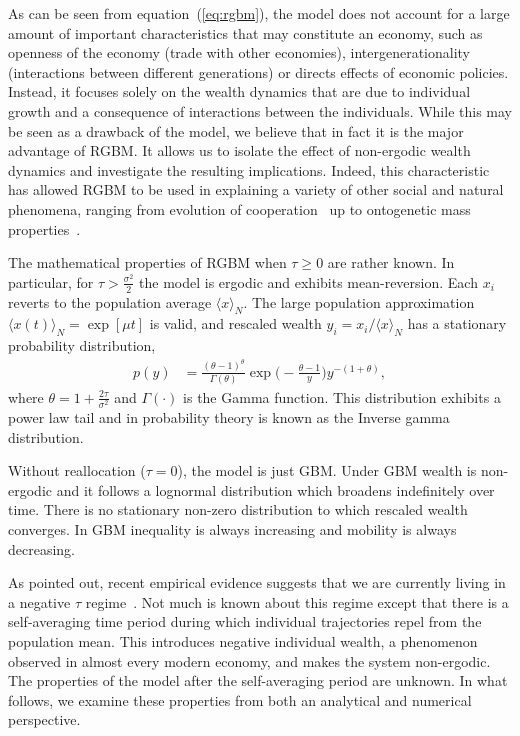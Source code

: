 \documentclass[11pt]{article}
\numberwithin{equation}{section}
\begin{document}
As can be seen from equation~(\ref{eq:rgbm}), the model does not account for a large amount of important characteristics that may constitute an economy, such as openness of the economy (trade with other economies), intergenerationality (interactions between different generations) or directs effects of economic policies. Instead, it focuses solely on the wealth dynamics that are due to individual growth and a consequence of interactions between the individuals. While this may be seen as a drawback of the model, we believe that in fact it is the major advantage of RGBM. It allows us to isolate the effect of non-ergodic wealth dynamics and investigate the resulting implications. Indeed, this characteristic has allowed RGBM to be used in explaining a variety of other social and natural phenomena, ranging from evolution of cooperation~\cite{peters2015evolutionary,stojkoski2018cooperation} up to ontogenetic mass properties~\cite{west2012allometry,holden2013change}. 


The mathematical properties of RGBM when $\tau \geq 0$ are rather known. In particular, for $\tau > \frac{\sigma^2}{2}$ the model is ergodic and exhibits mean-reversion. Each $x_i$ reverts to the population average $\langle x \rangle_N$. The large population approximation $\langle x(t) \rangle_N = \exp \left[\mu t\right]$ is valid, and rescaled wealth $y_i = x_i / \langle x \rangle_N$ has a stationary probability distribution, %
\begin{align}
    p(y) &= \frac{(\theta - 1)^{\theta}}{\Gamma(\theta)} \exp{\big(-\frac{\theta - 1}{y}\big)} y^{-(1+\theta)},
    \label{eq:stationary-distributin}
\end{align}
where $\theta = 1 + \frac{2 \tau}{\sigma^2}$ and $\Gamma(\cdot)$ is the Gamma function.
This distribution exhibits a power law tail and in probability theory is known as the Inverse gamma distribution.



Without reallocation ($\tau = 0$), the model is just GBM. Under GBM wealth is non-ergodic and it follows a lognormal distribution which broadens indefinitely over time. There is no stationary non-zero distribution to which rescaled wealth converges. In GBM inequality is always increasing and mobility is always decreasing.

As pointed out, recent empirical evidence suggests that we are currently living in a negative $\tau$ regime~\cite{berman2017empirical}. Not much is known about this regime except that there is a self-averaging time period during which individual trajectories repel from the population mean. This introduces negative individual wealth, a phenomenon observed in almost every modern economy, and makes the system non-ergodic. The properties of the model after the self-averaging period are unknown. In what follows, we examine these properties from both an analytical and numerical perspective.
\end{document}
